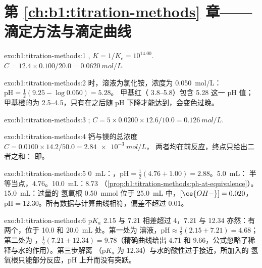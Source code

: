 \section*{第 \ref{ch:b1:titration-methods} 章——滴定方法与滴定曲线}

\begin{solution}{exo:b1:titration-methods:1}
, $K = 1/K_e = 10^{14.00}$. $C = 12.4 \times
0.100/20.0 = \qty{0.0620}{mol/L}$.
\end{solution}

\begin{solution}{exo:b1:titration-methods:2}
时，溶液为氯化铵，浓度为
\qty{0.050}{mol/L}：$\mathrm{pH} = \frac12(9.25 - \log 0.050) = 5.28$。
甲基红（ 3.8--5.8）包含 5.28 这一 pH 值；甲基橙的为 2.5--4.5，只有在之后随 pH 下降才能达到，会变色过晚。
\end{solution}

\begin{solution}{exo:b1:titration-methods:3}
;
$C = 5 \times 0.0200 \times 12.6/10.0 = \qty{0.126}{mol/L}$.
\end{solution}

\begin{solution}{exo:b1:titration-methods:4}
钙与镁的总浓度 $C = 0.0100 \times 14.2/50.0 = \qty{2.84e-3}{mol/L}$，
两者均在前反应，终点只给出二者之和：
即。
\end{solution}

\begin{solution}{exo:b1:titration-methods:5}
0~mL：，$\mathrm{pH} = \frac12(4.76 + 1.00) = 2.88$。5.0~mL：
半等当点，4.76。10.0~mL：8.73
（\cref{prop:b1:titration-methods:ph-at-equivalence}）。15.0~mL：过量的
氢氧根 \qty{0.50}{mmol} 位于 \qty{25.0}{mL} 中，$[\ce{OH-}] = 0.020$，
$\mathrm{pH} = 12.30$。所有数据与计算曲线相符，偏差不超过 0.01。
\end{solution}

\begin{solution}{exo:b1:titration-methods:6}
$\mathrm{p}K_a$ 2.15 与 7.21 相差超过 4，7.21 与
12.34 亦然：有两个，位于 10.0 和 \qty{20.0}{mL} 处。第一处为
 溶液，$\mathrm{pH} \approx \frac12(2.15 + 7.21) = 4.68$；第二处为
，$\frac12(7.21 + 12.34) = 9.78$（精确曲线给出 4.71 和
9.66，公式忽略了稀释与水的作用）。第三步解离
（$\mathrm{p}K_a$ 为 12.34）与水的酸性过于接近，所加入的
氢氧根只能部分反应，pH 上升而没有突跃。
\end{solution}


